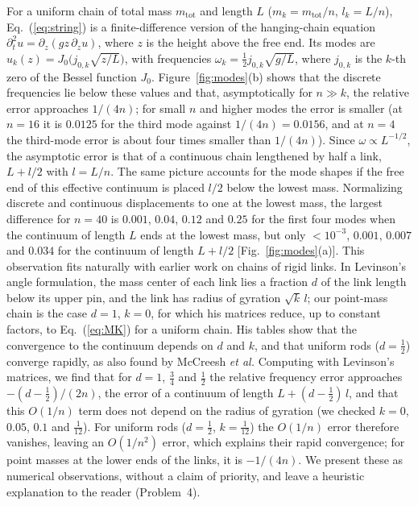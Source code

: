 \documentclass[11pt]{article}
\begin{document}
For a uniform chain of total mass $m_{\mathrm{tot}}$ and length $L$ ($m_k=m_{\mathrm{tot}}/n$, $l_k=L/n$), Eq.~(\ref{eq:string}) is a finite-difference version of the hanging-chain equation $\partial_t^2u=\partial_z(gz\,\partial_zu)$, where $z$ is the height above the free end. Its modes are $u_k(z)=J_0\bigl(j_{0,k}\sqrt{z/L}\bigr)$, with frequencies $\omega_k=\tfrac12 j_{0,k}\sqrt{g/L}$, where $j_{0,k}$ is the $k$-th zero of the Bessel function $J_0$.\cite{verbin2015boundary} Figure~\ref{fig:modes}(b) shows that the discrete frequencies lie below these values and that, asymptotically for $n\gg k$, the relative error approaches $1/(4n)$; for small $n$ and higher modes the error is smaller (at $n=16$ it is $0.0125$ for the third mode against $1/(4n)=0.0156$, and at $n=4$ the third-mode error is about four times smaller than $1/(4n)$). Since $\omega\propto L^{-1/2}$, the asymptotic error is that of a continuous chain lengthened by half a link, $L+l/2$ with $l=L/n$. The same picture accounts for the mode shapes if the free end of this effective continuum is placed $l/2$ below the lowest mass. Normalizing discrete and continuous displacements to one at the lowest mass, the largest difference for $n=40$ is $0.001$, $0.04$, $0.12$ and $0.25$ for the first four modes when the continuum of length $L$ ends at the lowest mass, but only $<10^{-3}$, $0.001$, $0.007$ and $0.034$ for the continuum of length $L+l/2$ [Fig.~\ref{fig:modes}(a)]. This observation fits naturally with earlier work on chains of rigid links. In Levinson's angle formulation, the mass center of each link lies a fraction $d$ of the link length below its upper pin, and the link has radius of gyration $\sqrt{k}\,l$; our point-mass chain is the case $d=1$, $k=0$, for which his matrices reduce, up to constant factors, to Eq.~(\ref{eq:MK}) for a uniform chain.\cite{levinson1977natural} His tables show that the convergence to the continuum depends on $d$ and $k$, and that uniform rods ($d=\frac12$) converge rapidly, as also found by McCreesh \emph{et al.}\cite{mccreesh1975vibrations} Computing with Levinson's matrices, we find that for $d=1$, $\frac34$ and $\frac12$ the relative frequency error approaches $-(d-\frac12)/(2n)$, the error of a continuum of length $L+(d-\frac12)\,l$, and that this $O(1/n)$ term does not depend on the radius of gyration (we checked $k=0$, $0.05$, $0.1$ and $\frac1{12}$). For uniform rods ($d=\frac12$, $k=\frac1{12}$) the $O(1/n)$ error therefore vanishes, leaving an $O(1/n^2)$ error, which explains their rapid convergence; for point masses at the lower ends of the links, it is $-1/(4n)$. We present these as numerical observations, without a claim of priority, and leave a heuristic explanation to the reader (Problem~4).
\end{document}

